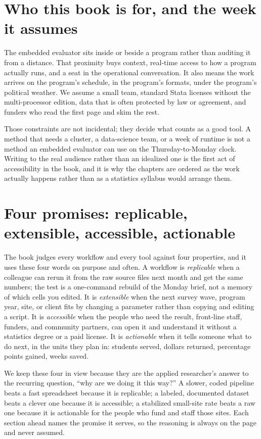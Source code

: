\documentclass[
    a4paper,
    fontsize=10pt,
    twoside=true,
    numbers=noenddot,
]{kaobook}
\begin{document}
\section{Who this book is for, and the week it assumes}
The embedded evaluator sits inside or beside a program rather than auditing it from a distance. That proximity buys context, real-time access to how a program actually runs, and a seat in the operational conversation. It also means the work arrives on the program's schedule, in the program's formats, under the program's political weather. We assume a small team, standard Stata licenses without the multi-processor edition, data that is often protected by law or agreement, and funders who read the first page and skim the rest.

Those constraints are not incidental; they decide what counts as a good tool. A method that needs a cluster, a data-science team, or a week of runtime is not a method an embedded evaluator can use on the Thursday-to-Monday clock. Writing to the real audience rather than an idealized one is the first act of accessibility in the book, and it is why the chapters are ordered as the work actually happens rather than as a statistics syllabus would arrange them.

\section{Four promises: replicable, extensible, accessible, actionable}\label{sec:promises}
The book judges every workflow and every tool against four properties, and it uses these four words on purpose and often. A workflow is \emph{replicable} when a colleague can rerun it from the raw source files next month and get the same numbers; the test is a one-command rebuild of the Monday brief, not a memory of which cells you edited. It is \emph{extensible} when the next survey wave, program year, site, or client fits by changing a parameter rather than copying and editing a script. It is \emph{accessible} when the people who need the result, front-line staff, funders, and community partners, can open it and understand it without a statistics degree or a paid license. It is \emph{actionable} when it tells someone what to do next, in the units they plan in: students served, dollars returned, percentage points gained, weeks saved.

We keep these four in view because they are the applied researcher's answer to the recurring question, \enquote{why are we doing it this way?} A slower, coded pipeline beats a fast spreadsheet because it is replicable; a labeled, documented dataset beats a clever one because it is accessible; a stabilized small-site rate beats a raw one because it is actionable for the people who fund and staff those sites. Each section ahead names the promise it serves, so the reasoning is always on the page and never assumed.
\end{document}
